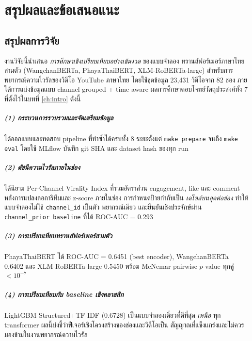 \chapter{สรุปผลและข้อเสนอแนะ}
\label{ch:conclusion}

\section{สรุปผลการวิจัย}
\label{sec:conclusion-summary}

งานวิจัยนี้นำเสนอ \emph{การศึกษาเชิงเปรียบเทียบอย่างเข้มงวด} ของแบบจำลอง
ทรานส์ฟอร์เมอร์ภาษาไทยสามตัว (WangchanBERTa, PhayaThaiBERT, XLM-RoBERTa-large)
สำหรับการพยากรณ์ความไวรัลของวิดีโอ YouTube ภาษาไทย โดยใช้ชุดข้อมูล 23{,}431
วิดีโอจาก 82 ช่อง ภายใต้การแบ่งข้อมูลแบบ channel-grouped + time-aware
ผลการศึกษาตอบโจทย์วัตถุประสงค์ทั้ง 7 ที่ตั้งไว้ในบทที่ \ref{ch:intro} ดังนี้

\paragraph{(1) กระบวนการรวบรวมและจัดเตรียมข้อมูล}
ได้ออกแบบและทดสอบ pipeline ที่ทำซ้ำได้ครบทั้ง 8 ระยะตั้งแต่ \texttt{make
prepare} จนถึง \texttt{make eval} โดยใช้ MLflow บันทึก git SHA และ
dataset hash ของทุก run

\paragraph{(2) ดัชนีความไวรัลภายในช่อง}
ได้นิยาม Per-Channel Virality Index ที่รวมอัตราส่วน engagement, like และ
comment หลังการแปลงลอการิทึมและ z-score ภายในช่อง การกำหนดป้ายกำกับเป็น
\emph{เดไซล์บนสุดต่อช่อง} ทำให้แบบจำลองไม่ใช้ \texttt{channel\_id} เป็นตัว
พยากรณ์เดียว และยืนยันเชิงประจักษ์ผ่าน \texttt{channel\_prior baseline}
ที่ได้ ROC-AUC = 0.293

\paragraph{(3) การเปรียบเทียบทรานส์ฟอร์เมอร์สามตัว}
PhayaThaiBERT ได้ ROC-AUC = 0.6451 (best encoder), WangchanBERTa 0.6402 และ
XLM-RoBERTa-large 0.5450 พร้อม McNemar pairwise $p$-value ทุกคู่ $< 10^{-7}$

\paragraph{(4) การเปรียบเทียบกับ baseline เชิงคลาสสิก}
LightGBM-Structured+TF-IDF (0.6728) เป็นแบบจำลองเดี่ยวที่ดีที่สุด \emph{เหนือ}
ทุก transformer ผลนี้บ่งชี้ว่าฟีเจอร์เชิงโครงสร้างของช่องและวิดีโอเป็น
สัญญาณที่แข็งแกร่งและไม่ควรมองข้ามในงานพยากรณ์ความไวรัล

